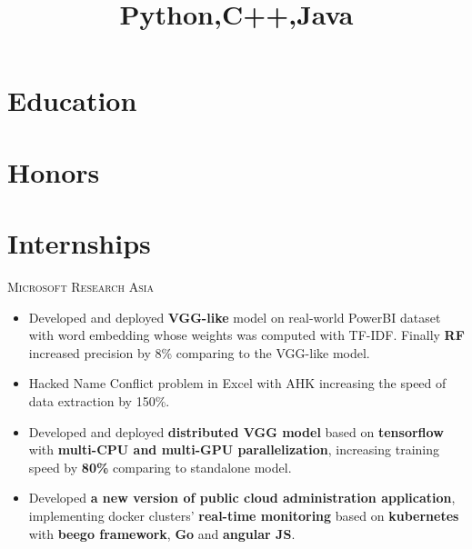 \documentclass[11pt,a4paper]{moderncv}
\title{Python,C++,Java}
\begin{document}
\maketitle
\section{Education}

\section{Honors}
\begin{comment}
\cventry{Dec. 2017}{} {\textbf{top 1\%}}{}{}{}
\cventry{Aug. 2017}{Second Prize} {Microsoft's Beauty of Programming 2017}{\textbf{top 2/1118}}{}{}
\cventry{Aug. 2017}{Excellence Award}  {Baidu \& XJTU Big Data Competition}{\textbf{top 10/1393}}{}{}
\cventry{Jun.  2017}{Champion of Lane Detection problem}{Momenta's Enterprise Award}{}{}{}
\end{comment}

\section{Internships}
 {\textsc{Microsoft Research Asia}}{}{}
{\begin{itemize}
\item Developed and deployed \textbf{VGG-like} model on real-world PowerBI dataset with word embedding whose weights was computed with TF-IDF. Finally \textbf{RF} increased precision by 8\% comparing to the VGG-like model.
\item Hacked Name Conflict problem in Excel with AHK increasing the speed of data extraction by 150\%.
\end{itemize}}

{
\begin{itemize}
\item Developed and deployed \textbf{distributed VGG model} based on \textbf{tensorflow} with \textbf{multi-CPU and multi-GPU parallelization}, increasing training speed by \textbf{80\%} comparing to standalone model.
\item Developed \textbf{a new version of public cloud administration application}, implementing docker clusters' \textbf{real-time monitoring} based on \textbf{kubernetes} with \textbf{beego framework}, \textbf{Go} and \textbf{angular JS}. 
\end{itemize}}
\end{document}
